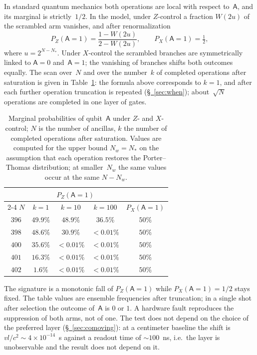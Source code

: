 \documentclass[11pt,a4paper]{article}
\newcommand{\qA}{\mathsf{A}}
\begin{document}
In standard quantum mechanics both operations are local with respect to~$\qA$, and its marginal is strictly~$1/2$. In the model, under $Z$-control a fraction $W(2u)$ of the scrambled arm vanishes, and after renormalization
\begin{equation}
P_Z(\qA{=}1)=\frac{1-W(2u)}{2-W(2u)},
\qquad
P_X(\qA{=}1)=\tfrac12,
\end{equation}
where $u=2^{N-N_*}$. Under $X$-control the scrambled branches are symmetrically linked to $\qA=0$ and~$\qA=1$; the vanishing of branches shifts both outcomes equally. The scan over~$N$ and over the number~$k$ of completed operations after saturation is given in Table~\ref{tab:marginal-scan}: the formula above corresponds to $k=1$, and after each further operation truncation is repeated (\hyperref[sec:when]{\S~\ref*{sec:when}}); about~$\sqrt N$ operations are completed in one layer of gates.
\begin{table}[ht]
\centering
\begin{tabular}{@{}ccccc@{}}
\toprule
 & \multicolumn{3}{c}{$P_Z(\qA{=}1)$} & \\
\cmidrule(lr){2-4}
$N$ & $k=1$ & $k=10$ & $k=100$ & $P_X(\qA{=}1)$ \\
\midrule
$396$ & $49.9\%$ & $48.9\%$ & $36.5\%$ & $50\%$ \\
$398$ & $48.6\%$ & $30.9\%$ & $<0.01\%$ & $50\%$ \\
$400$ & $35.6\%$ & $<0.01\%$ & $<0.01\%$ & $50\%$ \\
$401$ & $16.3\%$ & $<0.01\%$ & $<0.01\%$ & $50\%$ \\
$402$ & $1.6\%$ & $<0.01\%$ & $<0.01\%$ & $50\%$ \\
\bottomrule
\end{tabular}
\caption{Marginal probabilities of qubit~$\qA$ under $Z$- and $X$-control; $N$ is the number of ancillas, $k$ the number of completed operations after saturation. Values are computed for the upper bound $N_w=N_*$ on the assumption that each operation restores the Porter--Thomas distribution; at smaller~$N_w$ the same values occur at the same $N-N_w$.}
\label{tab:marginal-scan}
\end{table}
The signature is a monotonic fall of $P_Z(\qA{=}1)$ while $P_X(\qA{=}1)=1/2$ stays fixed. The table values are ensemble frequencies after truncation; in a single shot after selection the outcome of~$\qA$ is $0$ or $1$. A hardware fault reproduces the suppression of both arms, not of one. The test does not depend on the choice of the preferred layer (\hyperref[sec:comoving]{\S~\ref*{sec:comoving}}): at a centimeter baseline the shift is $vl/c^2\sim4\times10^{-14}$~s against a readout time of $\sim100$~ns, i.e.\ the layer is unobservable and the result does not depend on it.
\end{document}
